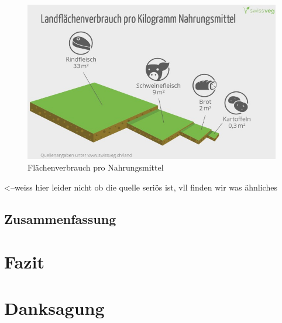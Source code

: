 \documentclass{scrartcl}
\begin{document}
\begin{figure}[htbp]
\centering
\includegraphics[width=14cm]{image_folder/landverbrauch.jpg}
\caption{Flächenverbrauch pro Nahrungsmittel}
\label{fig:Flächenverbrauch proNahrungsmittel}
\end{figure}<--weiss hier leider nicht ob die quelle seriös ist, vll finden wir was ähnliches

\subsection{Zusammenfassung}

\section{Fazit}

\section{Danksagung}

\newpage
\listoffigures

\begingroup
\singlespacing
\setlength\bibitemsep{10pt} %
\printbibliography
\endgroup
\end{document}
